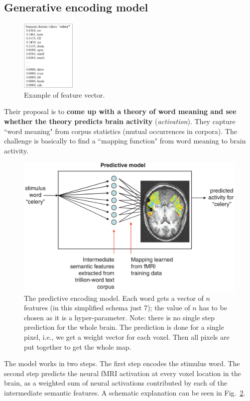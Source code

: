 \subsection{Generative encoding model}
\begin{figure}
  \centering
  \includegraphics[width=0.23\textwidth]{images/mitchell_2.png}
  \caption{Example of feature vector.}
  \label{fig:mitchell_2}
\end{figure}
Their proposal is to \textbf{come up with a theory of word meaning and see whether the theory predicts brain activity} (\textit{activation}). They capture ``word meaning" from corpus statistics (mutual occurrences in corpora). The challenge is basically to find a ``mapping function" from word meaning to brain activity.
\begin{figure}
    \centering
    \captionsetup{width=.8\linewidth}
    \includegraphics[width=0.55\linewidth]{images/mitchell.png}
    \caption{The predictive encoding model. Each word gets a vector of $n$ features (in this simplified schema just 7); the value of $n$ has to be chosen as it is a hyper-parameter. Note: there is no single step prediction for the whole brain. The prediction is done for a single pixel, i.e., we get a weight vector for each voxel. Then all pixels are put together to get the whole map.}
    \label{fig:mitchell}
\end{figure}

The model works in two steps. The first step encodes the stimulus word.
The second step predicts the neural fMRI activation at every voxel location in the brain, as a weighted sum of neural activations contributed by each of the intermediate semantic features. A schematic explanation can be seen in Fig.~\ref{fig:mitchell}.

